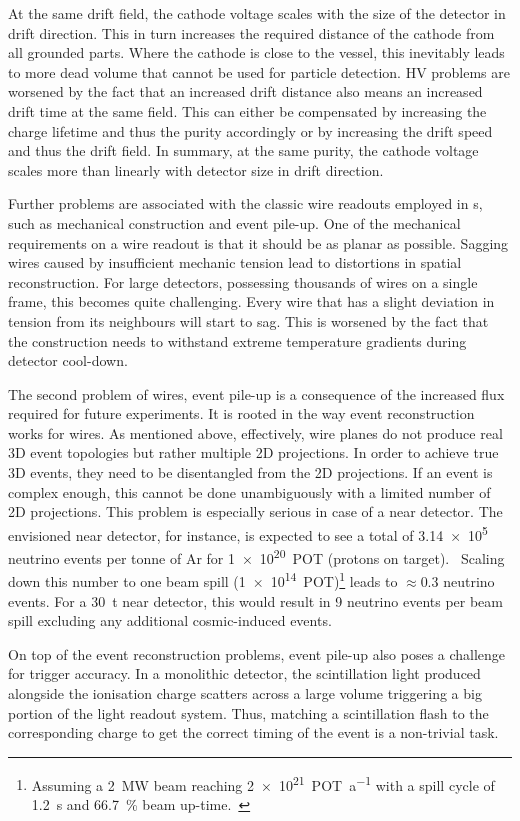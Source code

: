 At the same drift field, the cathode voltage scales with the size of the detector in drift direction.
This in turn increases the required distance of the cathode from all grounded parts.
Where the cathode is close to the \lar{} vessel, this inevitably leads to more dead volume that cannot be used for particle detection.
HV problems are worsened by the fact that an increased drift distance also means an increased drift time at the same field.
This can either be compensated by increasing the charge lifetime and thus the \lar{} purity accordingly or by increasing the drift speed and thus the drift field.
In summary, at the same \lar{} purity, the cathode voltage scales more than linearly with detector size in drift direction.

Further problems are associated with the classic wire readouts employed in \lartpc{}s, such as mechanical construction and event pile-up.
One of the mechanical requirements on a wire readout is that it should be as planar as possible.
Sagging wires caused by insufficient mechanic tension lead to distortions in spatial reconstruction.
For large detectors, possessing thousands of wires on a single frame, this becomes quite challenging.
Every wire that has a slight deviation in tension from its neighbours will start to sag.
This is worsened by the fact that the construction needs to withstand extreme temperature gradients during detector cool-down.

The second problem of wires, event pile-up is a consequence of the increased flux required for future experiments.
It is rooted in the way event reconstruction works for wires.
As mentioned above, effectively, wire planes do not produce real 3D event topologies but rather multiple 2D projections.
In order to achieve true 3D events, they need to be disentangled from the 2D projections.
If an event is complex enough, this cannot be done unambiguously with a limited number of 2D projections.
This problem is especially serious in case of a near detector.
The envisioned \dune{} near detector, for instance, is expected to see a total of \num{3.14e5} neutrino events per tonne of Ar for \SI{1e20}{POT} (protons on target).~\cite{dune2}
Scaling down this number to one beam spill (\SI{1e14}{POT})\footnote{Assuming a \SI{2}{\mega\watt} beam reaching \SI{2e21}{POT\per a} with a spill cycle of \SI{1.2}{\second} and \SI{66.7}{\percent} beam up-time.~\cite{dune2, dune4}} leads to $\approx \num{0.3}$ neutrino events.
For a \SI{30}{\tonne} near detector, this would result in \num{9} neutrino events per beam spill excluding any additional cosmic-induced events.

On top of the event reconstruction problems, event pile-up also poses a challenge for trigger accuracy.
In a monolithic detector, the scintillation light produced alongside the ionisation charge scatters across a large volume triggering a big portion of the light readout system.
Thus, matching a scintillation flash to the corresponding charge to get the correct timing of the event is a non-trivial task.
